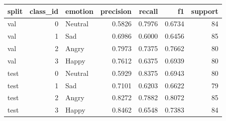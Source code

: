 \begin{tabular}{lrlrrrr}
\toprule
split & class_id & emotion & precision & recall & f1 & support \\
\midrule
val & 0 & Neutral & 0.5826 & 0.7976 & 0.6734 & 84 \\
val & 1 & Sad & 0.6986 & 0.6000 & 0.6456 & 85 \\
val & 2 & Angry & 0.7973 & 0.7375 & 0.7662 & 80 \\
val & 3 & Happy & 0.7612 & 0.6375 & 0.6939 & 80 \\
test & 0 & Neutral & 0.5929 & 0.8375 & 0.6943 & 80 \\
test & 1 & Sad & 0.7101 & 0.6203 & 0.6622 & 79 \\
test & 2 & Angry & 0.8272 & 0.7882 & 0.8072 & 85 \\
test & 3 & Happy & 0.8462 & 0.6548 & 0.7383 & 84 \\
\bottomrule
\end{tabular}
